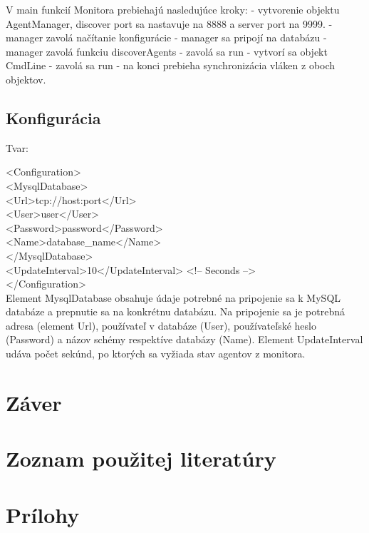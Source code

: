 \documentclass[a4paper,12pt]{article}
\begin{document}
V main funkcií Monitora prebiehajú nasledujúce kroky:
- vytvorenie objektu AgentManager, discover port sa nastavuje na 8888 a server port na 9999.
- manager zavolá načítanie konfigurácie
- manager sa pripojí na databázu
- manager zavolá funkciu discoverAgents
- zavolá sa run
- vytvorí sa objekt CmdLine
- zavolá sa run
- na konci prebieha synchronizácia vláken z oboch objektov.

\subsection{Konfigurácia}

Tvar:

<Configuration> \\
<MysqlDatabase> \\
<Url>tcp://host:port</Url> \\
<User>user</User> \\
<Password>password</Password> \\
<Name>database\_name</Name> \\
</MysqlDatabase> \\
<UpdateInterval>10</UpdateInterval> <!-- Seconds --> \\
</Configuration> \\

Element MysqlDatabase obsahuje údaje potrebné na pripojenie sa k MySQL databáze a prepnutie sa na konkrétnu databázu. Na pripojenie sa je potrebná adresa (element Url), používateľ v databáze (User), používateľské heslo (Password) a názov schémy respektíve databázy (Name). Element UpdateInterval udáva počet sekúnd, po ktorých sa vyžiada stav agentov z monitora.


\section*{Záver}
\newpage

\section*{Zoznam použitej literatúry}

\newpage

\section*{Prílohy}

\newpage
\end{document}

